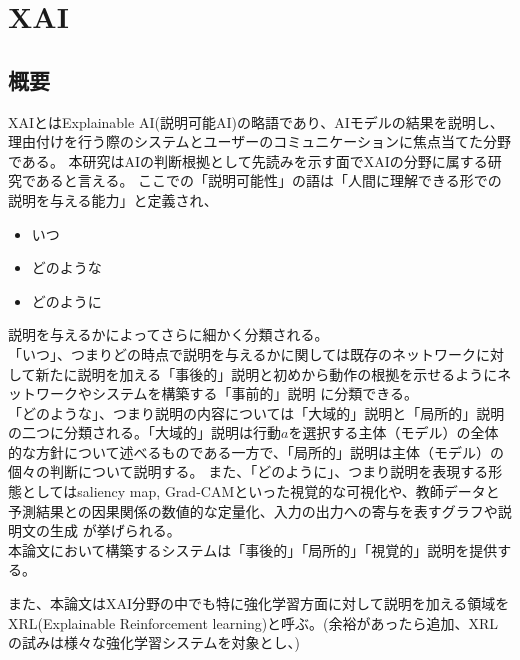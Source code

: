 \section{XAI}

\subsection{概要}
XAIとはExplainable AI(説明可能AI)の略語であり、AIモデルの結果を説明し、理由付けを行う際のシステムとユーザーのコミュニケーションに焦点当てた分野である\cite{consider}。
本研究はAIの判断根拠として先読みを示す面でXAIの分野に属する研究であると言える。
ここでの「説明可能性」の語は「人間に理解できる形での説明を与える能力」\cite{definition}と定義され、
\begin{itemize}
    \item いつ
    \item どのような
    \item どのように
\end{itemize}
説明を与えるかによってさらに細かく分類される。\\
「いつ」、つまりどの時点で説明を与えるかに関しては既存のネットワークに対して新たに説明を加える「事後的」説明と初めから動作の根拠を示せるようにネットワークやシステムを構築する「事前的」説明
に分類できる\cite{definition}。\\
「どのような」、つまり説明の内容については「大域的」説明と「局所的」説明の二つに分類される。「大域的」説明は行動$a$を選択する主体（モデル）の全体的な方針について述べるものである一方で、「局所的」説明は主体（モデル）の個々の判断について説明する\cite{gl}。
また、「どのように」、つまり説明を表現する形態としてはsaliency map\cite{saliency}, Grad-CAM\cite{Grad-CAM}といった視覚的な可視化や、教師データと予測結果との因果関係の数値的な定量化\cite{定量}、入力の出力への寄与を表すグラフや説明文の生成\cite{LIME}
が挙げられる。\\
本論文において構築するシステムは「事後的」「局所的」「視覚的」説明を提供する。

また、本論文はXAI分野の中でも特に強化学習方面に対して説明を加える領域をXRL(Explainable Reinforcement learning)と呼ぶ。(余裕があったら追加、XRLの試みは様々な強化学習システムを対象とし、)
